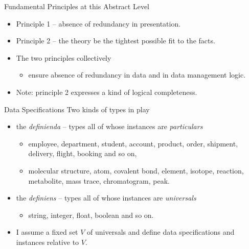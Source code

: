 

\begin{frame}{Fundamental Principles at this Abstract Level}
\begin{itemize}
    \item Principle 1 -- absence of redundancy in presentation.
    \item Principle 2 -- the theory be the tightest possible fit to the facts.
\end{itemize}
\bigskip
\begin{itemize}
    \item The two principles collectively
    \begin{itemize}
        \item ensure absence of redundancy in data and in data management logic.
    \end{itemize}
\end{itemize}
\bigskip
\begin{itemize}
    \item Note: principle 2 expresses a kind of logical completeness.
\end{itemize}
\end{frame}

\begin{frame}{Data Specifications}
Two kinds of types in play
\begin{itemize}
\item  the \textit{definienda} -- types all of whose instances are \textit{particulars}
\begin{itemize}
\item employee, department, student, account, product, order, shipment, delivery, flight, booking and so on,
\item molecular structure, atom, covalent bond, element, isotope, reaction, metabolite, mass trace, chromatogram, peak.
\end{itemize}
\pause 
\item  the \textit{definiens}  -- types all of whose instances are \textit{universals}
\begin{itemize}
       \item string, integer, float, boolean and so on.
\end{itemize}
\end{itemize}
\pause
\begin{itemize}
\item I assume a fixed set $V$ of universals and define data specifications and instances relative to $V$.
\end{itemize}
\end{frame}

